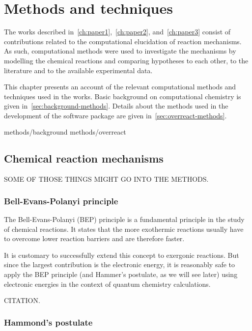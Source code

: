\chapter{Methods and techniques}%
\label{ch:methods}

The works described in~\cref{ch:paper1},~\cref{ch:paper2}, and~\cref{ch:paper3} consist of contributions related to the computational
elucidation of reaction mechanisms.
As such, computational methods were used to investigate the mechanisms by
modelling the chemical reactions and comparing hypotheses to each other,
to the literature and to the available experimental data.

This chapter presents an account of the relevant computational methods and
techniques used in the works.
Basic background on computational chemistry is given in~\cref{sec:background-methods}.
Details about the methods used in the development of the \overreact{} software
package are given in~\cref{sec:overreact-methods}.

{methods/background}
{methods/overreact}

\section{Chemical reaction mechanisms}

SOME OF THOSE THINGS MIGHT GO INTO THE METHODS.\@

\subsection{Bell-Evans-Polanyi principle}

The Bell-Evans-Polanyi (BEP) principle is a fundamental principle in the study
of chemical reactions.
It states that the more exothermic reactions usually have to overcome lower
reaction barriers and are therefore faster.

It is customary to successfully extend this concept to exergonic reactions.
But since the largest contribution is the electronic energy, it is reasonably
safe to apply the BEP principle (and Hammer's postulate, as we will see later)
using electronic energies in the context of quantum chemistry calculations.

CITATION.\@

\subsection{Hammond's postulate}

